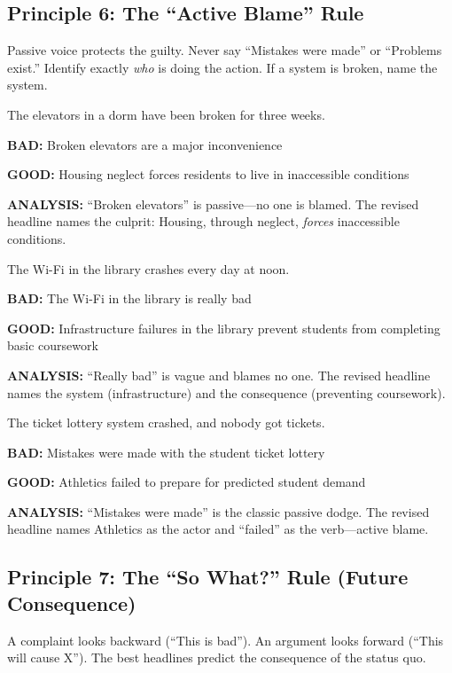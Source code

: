 \documentclass[12pt]{article}
\newcommand{\bad}[1]{\textbf{\textcolor{rose}{BAD:}} #1}
\newcommand{\good}[1]{\textbf{\textcolor{congaree}{GOOD:}} #1}
\newcommand{\context}[1]{#1}
\begin{document}
\newpage
\subsection{Principle 6: The ``Active Blame'' Rule}
Passive voice protects the guilty. Never say ``Mistakes were made'' or ``Problems exist.'' Identify exactly \textit{who} is doing the action. If a system is broken, name the system.

\begin{exampleblock}
\context{The elevators in a dorm have been broken for three weeks.}

\bad{Broken elevators are a major inconvenience}

\good{Housing neglect forces residents to live in inaccessible conditions}

\textbf{ANALYSIS:} ``Broken elevators'' is passive---no one is blamed. The revised headline names the culprit: Housing, through neglect, \textit{forces} inaccessible conditions.
\end{exampleblock}

\begin{exampleblock}
\context{The Wi-Fi in the library crashes every day at noon.}

\bad{The Wi-Fi in the library is really bad}

\good{Infrastructure failures in the library prevent students from completing basic coursework}

\textbf{ANALYSIS:} ``Really bad'' is vague and blames no one. The revised headline names the system (infrastructure) and the consequence (preventing coursework).
\end{exampleblock}

\begin{exampleblock}
\context{The ticket lottery system crashed, and nobody got tickets.}

\bad{Mistakes were made with the student ticket lottery}

\good{Athletics failed to prepare for predicted student demand}

\textbf{ANALYSIS:} ``Mistakes were made'' is the classic passive dodge. The revised headline names Athletics as the actor and ``failed'' as the verb---active blame.
\end{exampleblock}

\newpage
\subsection{Principle 7: The ``So What?'' Rule (Future Consequence)}
A complaint looks backward (``This is bad''). An argument looks forward (``This will cause X''). The best headlines predict the consequence of the status quo.
\end{document}
